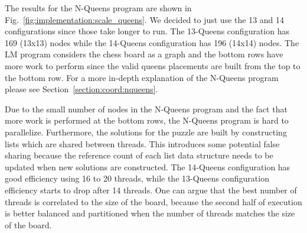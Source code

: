 The results for the N-Queens program are shown in
Fig.~\ref{fig:implementation:scale_queens}. We decided to just use the 13 and 14
configurations since those take longer to run. The 13-Queens configuration has
169 (13x13) nodes while the 14-Queens configuration has 196 (14x14) nodes. The LM program
considers the chess board as a graph and the bottom rows have more work to
perform since the valid queens placements are built from the top to the bottom
row. For a more in-depth explanation of the N-Queens program please see
Section~\ref{section:coord:nqueens}.

Due to the small number of nodes in the N-Queens program and the fact that more
work is performed at the bottom rows, the N-Queens program is hard to
parallelize. Furthermore, the solutions for the puzzle are built by constructing
lists which are shared between threads. This introduces some potential false
sharing because the reference count of each list data structure needs to be
updated when new solutions are constructed. The 14-Queens configuration has good
efficiency using 16 to 20 threads, while the 13-Queens configuration efficiency
starts to drop after 14 threads. One can argue that the best number of threads
is correlated to the size of the board, because the second half of execution is
better balanced and partitioned when the number of threads matches the size of
the board.

